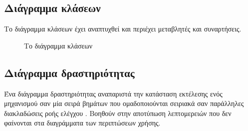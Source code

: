\documentclass{assignment}
\begin{document}
\subsection{Διάγραμμα κλάσεων}

Το διάγραμμα κλάσεων έχει αναπτυχθεί και περιέχει μεταβλητές και συναρτήσεις.

\begin{landscape}
\begin{figure}
\begin{center}
\caption{Το διάγραμμα κλάσεων}
\label{fig:Class_Diagramm}
\end{center}
\end{figure}
\end{landscape}

\subsection{Διάγραμμα δραστηριότητας}

Ένα διάγραμμα δραστηριότητας αναπαριστά την κατάσταση εκτέλεσης ενός μηχανισμού σαν μία σειρά βημάτων που ομαδοποιούνται σειριακά σαν παράλληλες διακλαδώσεις ροής ελέγχου \cite{virvou_uml}. Βοηθούν στην αποτύπωση λεπτομερειών που δεν φαίνονται στα διαγράμματα των περιπτώσεων χρήσης.
\end{document}
